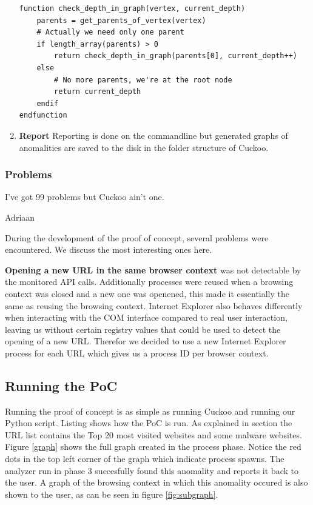 \begin{enumerate}
\begin{lstlisting}
function check_depth_in_graph(vertex, current_depth)
    parents = get_parents_of_vertex(vertex)
    # Actually we need only one parent
    if length_array(parents) > 0
        return check_depth_in_graph(parents[0], current_depth++)
    else
        # No more parents, we're at the root node
        return current_depth
    endif
endfunction
\end{lstlisting}


\item \textbf{Report} Reporting is done on the commandline but generated graphs of anomalities are saved to the disk in the folder structure of Cuckoo.
\end{enumerate}

\subsubsection{Problems}
\label{99problems}
\epigraph{I've got 99 problems but Cuckoo ain't one.}{Adriaan}

During the development of the proof of concept, several problems were encountered. We discuss the most interesting ones here.

\textbf{Opening a new URL in the same browser context} was not detectable by the monitored API calls. Additionally processes were reused when a browsing context was closed and a new one was openened, this made it essentially the same as reusing the browsing context. Internet Explorer also behaves differently when interacting with the COM interface compared to real user interaction, leaving us without certain registry values that could be used to detect the opening of a new URL. Therefor we decided to use a new Internet Explorer process for each URL which gives us a process ID per browser context.

\subsection{Running the PoC}

Running the proof of concept is as simple as running Cuckoo and running our Python script. Listing  shows how the PoC is run. As explained in section  the URL list contains the Top 20 most visited websites and some malware websites. Figure \ref{graph} shows the full graph created in the process phase. Notice the red dots in the top left corner of the graph which indicate process spawns. The analyzer run in phase 3 succesfully found this anomality and reports it back to the user. A graph of the browsing context in which this anomality occured is also shown to the user, as can be seen in figure \ref{fig:subgraph}.

